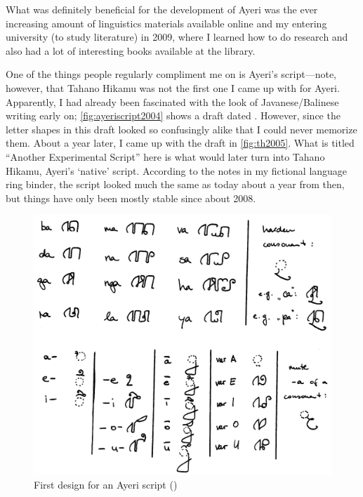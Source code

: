 What was definitely beneficial for the development of Ayeri was the ever 
increasing amount of linguistics materials available online and my entering 
university (to study literature) in 2009, where I learned how to do research 
and also had a lot of interesting books available at the library.

One of the things people regularly compliment me on is Ayeri's script---note, 
however, that Tahano Hikamu was not the first one I came up with for Ayeri. 
Apparently, I had already been fascinated with the look of Javanese/Balinese 
writing early on; \autoref{fig:ayeriscript2004} shows a draft dated 
. However, since the letter shapes in this draft looked so 
confusingly alike that I could never memorize them. About a year later, I came 
up with the draft in \autoref{fig:th2005}. What is titled ``Another 
Experimental Script'' here is what would later turn into Tahano Hikamu, Ayeri's 
`native' script. According to the notes in my fictional language ring binder, 
the script looked much the same as today about a year from then, but things 
have only been mostly stable since about 2008.

\begin{figure}
	\centering
	\includegraphics[width=\textwidth, keepaspectratio]{images/ayeriscript2004-300dpi-bw.png}
	\caption[First design for an Ayeri script]{First design for an Ayeri script ()}
	\label{fig:ayeriscript2004}
\end{figure}


